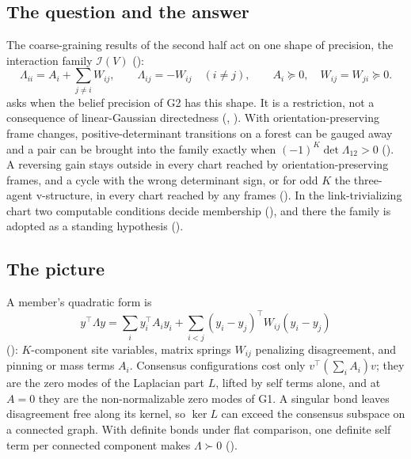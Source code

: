 \subsection{The question and the answer}

The coarse-graining results of the second half act on one shape of precision, the interaction family
\(\mathcal I(V)\) ():
\[
\Lambda_{ii}=A_i+\sum_{j\neq i}W_{ij},
\qquad
\Lambda_{ij}=-W_{ij}\quad(i\neq j),
\qquad
A_i\succeq0,\quad W_{ij}=W_{ji}\succeq0.
\]
 asks when the belief precision of G2 has this shape. It is a restriction, not a
consequence of linear-Gaussian directedness (,
). With
orientation-preserving frame changes, positive-determinant transitions on a forest can be gauged away and
a pair can be brought into the family exactly when \((-1)^K\det\Lambda_{12}>0\)
(). A reversing gain stays outside in every chart reached by
orientation-preserving frames, and a cycle with the wrong determinant sign, or for odd \(K\) the
three-agent v-structure, in every chart reached by any frames (). In the
link-trivializing chart two computable conditions decide membership
(), and there the family is adopted as a standing hypothesis
().

\subsection{The picture}

A member's quadratic form is
\[
y^\top\Lambda y=\sum_{i}y_i^\top A_iy_i+\sum_{i<j}(y_i-y_j)^\top W_{ij}(y_i-y_j)
\]
(): \(K\)-component site variables, matrix springs
\(W_{ij}\) penalizing disagreement, and pinning or mass terms \(A_i\). Consensus configurations cost only
\(v^\top(\sum_iA_i)v\); they are the zero modes of the Laplacian part \(L\), lifted by self terms alone,
and at \(A=0\) they are the non-normalizable zero modes of G1. A singular bond leaves disagreement free
along its kernel, so \(\ker L\) can exceed the consensus subspace on a connected graph. With definite
bonds under flat comparison, one definite self term per connected component makes \(\Lambda\succ0\)
().

